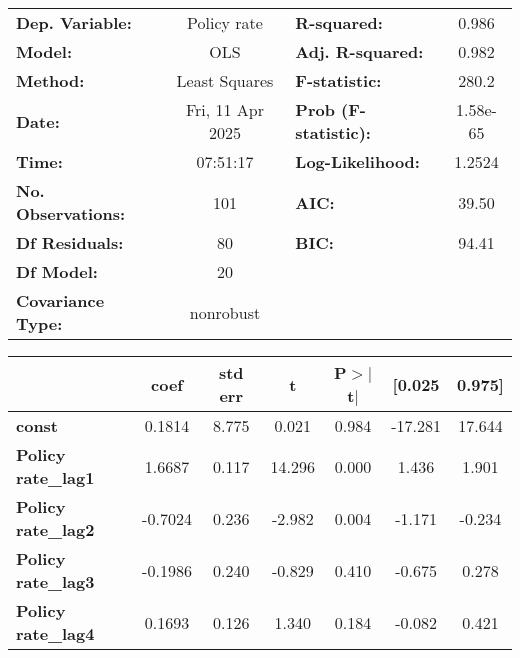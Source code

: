 \begin{center}
\begin{tabular}{lclc}
\toprule
\textbf{Dep. Variable:}         &   Policy rate    & \textbf{  R-squared:         } &     0.986   \\
\textbf{Model:}                 &       OLS        & \textbf{  Adj. R-squared:    } &     0.982   \\
\textbf{Method:}                &  Least Squares   & \textbf{  F-statistic:       } &     280.2   \\
\textbf{Date:}                  & Fri, 11 Apr 2025 & \textbf{  Prob (F-statistic):} &  1.58e-65   \\
\textbf{Time:}                  &     07:51:17     & \textbf{  Log-Likelihood:    } &    1.2524   \\
\textbf{No. Observations:}      &         101      & \textbf{  AIC:               } &     39.50   \\
\textbf{Df Residuals:}          &          80      & \textbf{  BIC:               } &     94.41   \\
\textbf{Df Model:}              &          20      & \textbf{                     } &             \\
\textbf{Covariance Type:}       &    nonrobust     & \textbf{                     } &             \\
\bottomrule
\end{tabular}
\begin{tabular}{lcccccc}
                                & \textbf{coef} & \textbf{std err} & \textbf{t} & \textbf{P$> |$t$|$} & \textbf{[0.025} & \textbf{0.975]}  \\
\midrule
\textbf{const}                  &       0.1814  &        8.775     &     0.021  &         0.984        &      -17.281    &       17.644     \\
\textbf{Policy rate\_lag1}      &       1.6687  &        0.117     &    14.296  &         0.000        &        1.436    &        1.901     \\
\textbf{Policy rate\_lag2}      &      -0.7024  &        0.236     &    -2.982  &         0.004        &       -1.171    &       -0.234     \\
\textbf{Policy rate\_lag3}      &      -0.1986  &        0.240     &    -0.829  &         0.410        &       -0.675    &        0.278     \\
\textbf{Policy rate\_lag4}      &       0.1693  &        0.126     &     1.340  &         0.184        &       -0.082    &        0.421     \\

\end{tabular}
\end{center}
